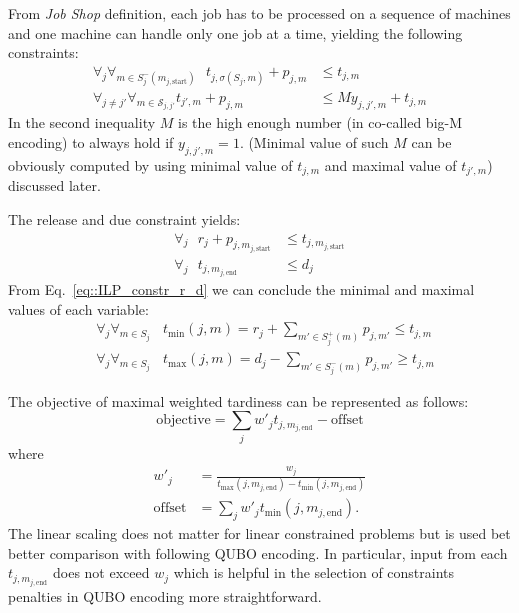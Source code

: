\documentclass[aps,pra,amsmath,amssymb,amsfonts,lengthcheck,twocolumn,superscriptaddress]{revtex4-1}
\begin{document}
From \emph{Job Shop} definition, each job has to be processed on a sequence of machines and one machine can handle only one job at a time, yielding the following constraints:
\begin{equation}
    \begin{split}
      \forall_{j} \forall_{m \in S_j^- (m_{j, \text{start}})} \ \ \  t_{j,\sigma(S_j, m)} + p_{j,m} &\leq t_{j,m}  \\
     \forall_{j \neq j'} \forall_{m \in \mathcal{S}_{j,j'}} t_{j', m} + p_{j,m} &\leq M y_{j,j', m} + t_{j,m} 
    \end{split}
    \label{eq::ILP_machines}
\end{equation}
In the second inequality $M$ is the high enough number (in co-called big-M encoding) to always hold if $y_{j,j',m} = 1$. (Minimal value of such $M$ can be obviously computed by using minimal value of $t_{j,m}$ and maximal value of $t_{j', m}$) discussed later.

The release and due constraint yields:
\begin{equation} 
\begin{split}
    \forall_{j} \  \ \ r_j + p_{j, m_{j, \text{start}}} &\leq t_{j, m_{j, \text{start}}} \\
    \forall_{j} \ \ \  t_{j, m_{j, \text{end}}} &\leq d_j
\end{split}\label{eq::ILP_constr_r_d}
\end{equation}
From Eq.~\eqref{eq::ILP_constr_r_d} we can conclude the minimal and maximal values of each variable:
\begin{equation} 
\begin{split}
    &\forall_{j}  \forall_{m \in S_j}\ \ \ \ t_{\text{min}}(j,m)  = r_j + \sum_{m' \in S^+_j(m)} p_{j, m'} \leq t_{j, m} \\
    &\forall_{j} \forall_{m \in S_j}\ \ \ \ t_{\text{max}}(j,m) =  d_j - \sum_{m' \in S^-_j(m)} p_{j, m'} \geq t_{j, m} 
\end{split}\label{eq::ILP_constr_limits}
\end{equation}

The objective of maximal weighted tardiness can be represented as follows:
\begin{equation}
    \text{objective} =  \sum_j w'_j t_{j, m_{j, \text{end}}} - \text{offset} 
    \label{eq::ilp_obj}
\end{equation}
where 
\begin{equation}
\begin{split}
    w'_j &=  \frac{w_j}{t_{\max}(j, m_{j, \text{end}}) - t_{\min}(j, m_{j, \text{end}}) }  \\
    \text{offset} &= \sum_j w'_j t_{\min}(j, m_{j, \text{end}}) .
\end{split}
\end{equation}
The linear scaling does not matter for linear constrained problems but is used bet better comparison with following QUBO encoding. In particular, input from each $ t_{j, m_{j, \text{end}}}$ does not exceed $w_j$ which is helpful in the selection of constraints penalties in QUBO encoding more straightforward.
\end{document}
